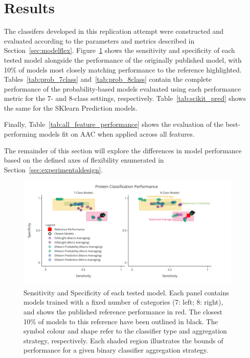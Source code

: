 \section {Results}
\label{sec:results}

The classifers developed in this replication attempt were constructed and evaluated according to the parameters
and metrics described in Section~\ref{sec:modelflex}. Figure~\ref{fig:7_class_model} shows the sensitivity
and specificity of each tested model alongside the performance of the originally published model, with 10\% of models
most closely matching performance to the reference highlighted.
Tables~\ref{tab:prob_7class} and~\ref{tab:prob_8class} contain the complete performance of the probability-based models
evaluated using each performance metric for the 7- and 8-class settings, respectively. Table~\ref{tab:scikit_pred}
shows the same for the SKlearn Prediction models.

Finally, Table~\ref{tab:all_feature_performance} shows the evaluation
of the best-performing models fit on AAC when applied across all features.

The remainder of this section will explore the differences in model performance based on the defined axes of
flexibility enumerated in Section~\ref{sec:experimentaldesign}.

\begin{figure}
  \centering
  \includegraphics[width=\textwidth]{figures/fig1_model_performance.pdf}
  \caption{Sensitivity and Specificity of each tested model. Each panel contains models trained with a fixed number of
categories (7: left; 8: right), and shows the published reference performance in red. The closest 10\% of models to
this reference have been outlined in black. The symbol colour and shape refer to the classifier type and aggregation
strategy, respectively. Each shaded region illustrates the bounds of performance for a given binary classifier
aggregation strategy.}
   \label{fig:7_class_model}
\end{figure}

